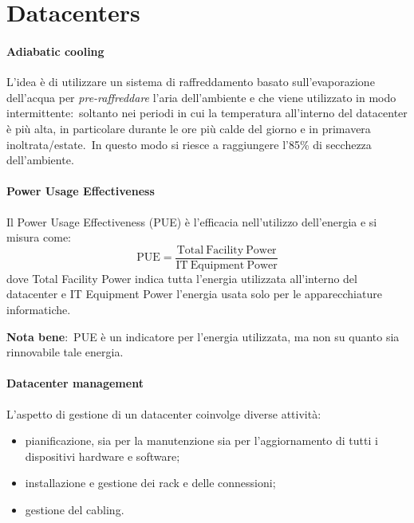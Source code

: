 \chapter{Datacenters}

\subsubsection{Adiabatic cooling}

L'idea è di utilizzare un sistema di raffreddamento basato sull'evaporazione dell'acqua per \textit{pre-raffreddare} l'aria dell'ambiente e che viene utilizzato in modo intermittente:\ soltanto nei periodi in cui la temperatura all'interno del datacenter è più alta, in particolare durante le ore più calde del giorno e in primavera inoltrata{\slash}estate.\
In questo modo si riesce a raggiungere l'85\% di secchezza dell'ambiente.\

\subsubsection{Power Usage Effectiveness}

Il Power Usage Effectiveness (PUE) è l'efficacia nell'utilizzo dell'energia e si misura come:
\[\mathrm{PUE = \frac{Total\ Facility\ Power}{IT\ Equipment\ Power}}\]
\noindent dove Total Facility Power indica tutta l'energia utilizzata all'interno del datacenter e IT Equipment Power l'energia usata solo per le apparecchiature informatiche.

\textbf{Nota bene}:\ PUE è un indicatore per l'energia utilizzata, ma non su quanto sia rinnovabile tale energia.

\subsubsection{Datacenter management}

L'aspetto di gestione di un datacenter coinvolge diverse attività:

\begin{itemize}
	\item pianificazione, sia per la manutenzione sia per l'aggiornamento di tutti i dispositivi hardware e software;
	\item installazione e gestione dei rack e delle connessioni;
	\item gestione del cabling.
\end{itemize}

